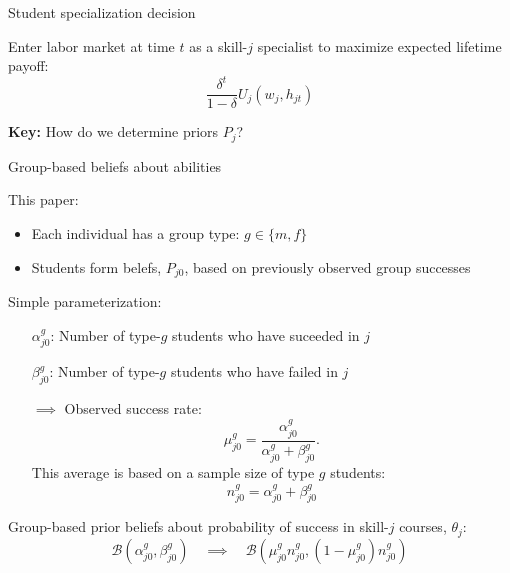 \documentclass[compress, 8pt]{beamer}
\newcommand{\pr}[1]{\left( #1 \right)}
\begin{document}
\begin{frame}{Student specialization decision}

\vspace{2ex}
Enter labor market at time $t$ as a skill-$j$ specialist to maximize expected lifetime payoff:
\begin{equation*}
	\frac{\delta^t}{1 - \delta} U_j (w_{j}, h_{jt})
\end{equation*}



\textbf{Key:} How do we determine priors $P_{j}$?

\end{frame}

\begin{frame}{Group-based beliefs about abilities}

This paper:
\begin{itemize}
	\item Each individual has a group type: $g \in \{m, f\}$

	\item Students form belefs, $P_{j0}$, based on previously observed group successes
\end{itemize}

\vspace{2ex}
Simple parameterization:
\begin{itemize}
	\item [$\alpha_{j0}^g$: ] Number of type-$g$ students who have suceeded in $j$ 
	\item [$\beta_{j0}^g$: ] Number of type-$g$ students who have failed in $j$

	\item [$\implies$] Observed success rate:
	\begin{equation*}
	\mu_{j0}^g = 
	  \frac{\alpha_{j0}^g}{\alpha_{j0}^g + \beta_{j0}^g}.
\end{equation*}
This average is based on a sample size of type $g$ students:
\begin{equation*}
 	n_{j0}^g = \alpha_{j0}^g + \beta_{j0}^g
 \end{equation*}
\end{itemize}

\vspace{2ex}
Group-based prior beliefs about probability of success in skill-$j$ courses, $\theta_j$:
\begin{equation*}
	\mathcal{B} \pr{\alpha_{j0}^g, \beta_{j0}^g} \quad \implies \quad
	\mathcal{B} \pr{\mu_{j0}^g n_{j0}^g, (1 - \mu_{j0}^g) n_{j0}^g}
\end{equation*}

\end{frame}
\end{document}
